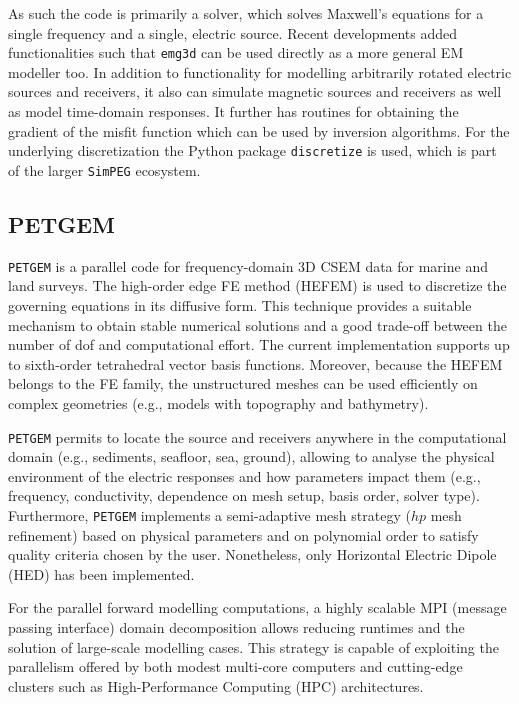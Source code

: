 \documentclass[a4paper, extra, camera,%
]{gji}
\newcommand{\simpeg}{\texttt{SimPEG}\xspace}
\newcommand{\discretize}{\texttt{discretize}\xspace}
\newcommand{\petgem}{\texttt{PETGEM}\xspace}
\begin{document}
As such the code is primarily a solver, which solves Maxwell's equations for a single frequency and a single, electric source. Recent developments added functionalities such that \texttt{emg3d} can be used directly as a more general EM modeller too. In addition to functionality for modelling arbitrarily rotated electric sources and receivers, it also can simulate magnetic sources and receivers as well as model time-domain responses. It further has routines for obtaining the gradient of the misfit function which can be used by inversion algorithms. For the underlying discretization the Python package \discretize is used, which is part of the larger \simpeg ecosystem.

\subsection{PETGEM}

\petgem is a parallel code for frequency-domain 3D CSEM data for marine and land surveys. The high-order edge FE method (HEFEM) is used to discretize the governing equations in its diffusive form. This technique provides a suitable mechanism to obtain stable numerical solutions and a good trade-off between the number of dof and computational effort. The current implementation supports up to sixth-order tetrahedral vector basis functions. Moreover, because the HEFEM belongs to the FE family, the unstructured meshes can be used efficiently on complex geometries (e.g., models with topography and bathymetry).

\petgem permits to locate the source and receivers anywhere in the computational domain (e.g., sediments, seafloor, sea, ground), allowing to analyse the physical environment of the electric responses and how parameters impact them (e.g., frequency, conductivity, dependence on mesh setup, basis order, solver type). Furthermore, \petgem implements a semi-adaptive mesh strategy ($hp$ mesh refinement) based on physical parameters and on polynomial order to satisfy quality criteria chosen by the user. Nonetheless, only Horizontal Electric Dipole (HED) has been implemented.

For the parallel forward modelling computations, a highly scalable MPI (message passing interface) domain decomposition allows reducing runtimes and the solution of large-scale modelling cases. This strategy is capable of exploiting the parallelism offered by both modest multi-core computers and cutting-edge clusters such as High-Performance Computing (HPC) architectures.
\end{document}
